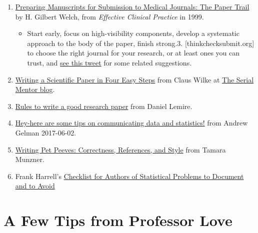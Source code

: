\documentclass[
]{book}
\providecommand{\tightlist}{%
  \setlength{\itemsep}{0pt}\setlength{\parskip}{0pt}}
\begin{document}
\begin{enumerate}
\def\labelenumi{\arabic{enumi}.}
\tightlist
\item
  \href{https://pdfs.semanticscholar.org/48a8/88d557e694e17444cb6686c472753ccc66df.pdf}{Preparing Manuscripts for Submission to Medical Journals: The Paper Trail} by H. Gilbert Welch, from \emph{Effective Clinical Practice} in 1999.

  \begin{itemize}
  \tightlist
  \item
    Start early, focus on high-visibility components, develop a systematic approach to the body of the paper, finish strong.3. {[}thinkchecksubmit.org{]} to choose the right journal for your research, or at least ones you can trust, and \href{https://twitter.com/laura_tastic/status/1026573387429228551}{see this tweet} for some related suggestions.
  \end{itemize}
\item
  \href{https://serialmentor.com/blog/2013/8/29/writing-a-scientific-paper-in-four-easy-steps}{Writing a Scientific Paper in Four Easy Steps} from Claus Wilke at \href{https://serialmentor.com/}{The Serial Mentor blog}.
\item
  \href{https://lemire.me/blog/rules-to-write-a-good-research-paper/}{Rules to write a good research paper} from Daniel Lemire.
\item
  \href{https://statmodeling.stat.columbia.edu/2017/06/02/hey-tips-communicating-data-statistics/}{Hey-here are some tips on communicating data and statistics!} from Andrew Gelman 2017-06-02.
\item
  \href{https://www.cs.ubc.ca/~tmm/writing.html}{Writing Pet Peeves: Correctness, References, and Style} from Tamara Munzner.
\item
  Frank Harrell's \href{http://biostat.mc.vanderbilt.edu/wiki/Main/ManuscriptChecklist}{Checklist for Authors of Statistical Problems to Document and to Avoid}
\end{enumerate}

\hypertarget{a-few-tips-from-professor-love}{%
\section{A Few Tips from Professor Love}\label{a-few-tips-from-professor-love}}
\end{document}
